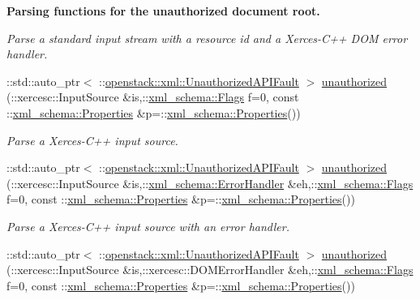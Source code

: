 \begin{Indent}{\bf Parsing functions for the unauthorized document root.}
\begin{DoxyCompactItemize}
\begin{DoxyCompactList}\small\item\em Parse a standard input stream with a resource id and a Xerces-\/C++ DOM error handler. \item\end{DoxyCompactList}\item 
::std::auto\_\-ptr$<$ ::\hyperlink{classopenstack_1_1xml_1_1UnauthorizedAPIFault}{openstack::xml::UnauthorizedAPIFault} $>$ \hyperlink{namespaceopenstack_1_1xml_ae7ebb7f695547452b1868675a9839183}{unauthorized} (::xercesc::InputSource \&is,::\hyperlink{namespacexml__schema_affb4c227cbd9aa7453dd1dc5a1401943}{xml\_\-schema::Flags} f=0, const ::\hyperlink{namespacexml__schema_ad27ce19a7ee1d3b1064092648898f64c}{xml\_\-schema::Properties} \&p=::\hyperlink{namespacexml__schema_ad27ce19a7ee1d3b1064092648898f64c}{xml\_\-schema::Properties}())
\begin{DoxyCompactList}\small\item\em Parse a Xerces-\/C++ input source. \item\end{DoxyCompactList}\item 
::std::auto\_\-ptr$<$ ::\hyperlink{classopenstack_1_1xml_1_1UnauthorizedAPIFault}{openstack::xml::UnauthorizedAPIFault} $>$ \hyperlink{namespaceopenstack_1_1xml_a50edc436465fc980c6fc7a24fefe1e59}{unauthorized} (::xercesc::InputSource \&is,::\hyperlink{namespacexml__schema_ab1c9361bfd3b404eaabf0c31eded79dc}{xml\_\-schema::ErrorHandler} \&eh,::\hyperlink{namespacexml__schema_affb4c227cbd9aa7453dd1dc5a1401943}{xml\_\-schema::Flags} f=0, const ::\hyperlink{namespacexml__schema_ad27ce19a7ee1d3b1064092648898f64c}{xml\_\-schema::Properties} \&p=::\hyperlink{namespacexml__schema_ad27ce19a7ee1d3b1064092648898f64c}{xml\_\-schema::Properties}())
\begin{DoxyCompactList}\small\item\em Parse a Xerces-\/C++ input source with an error handler. \item\end{DoxyCompactList}\item 
::std::auto\_\-ptr$<$ ::\hyperlink{classopenstack_1_1xml_1_1UnauthorizedAPIFault}{openstack::xml::UnauthorizedAPIFault} $>$ \hyperlink{namespaceopenstack_1_1xml_ac60971d3e3eba35624357937e559f243}{unauthorized} (::xercesc::InputSource \&is,::xercesc::DOMErrorHandler \&eh,::\hyperlink{namespacexml__schema_affb4c227cbd9aa7453dd1dc5a1401943}{xml\_\-schema::Flags} f=0, const ::\hyperlink{namespacexml__schema_ad27ce19a7ee1d3b1064092648898f64c}{xml\_\-schema::Properties} \&p=::\hyperlink{namespacexml__schema_ad27ce19a7ee1d3b1064092648898f64c}{xml\_\-schema::Properties}())

\end{DoxyCompactItemize}
\end{Indent}
